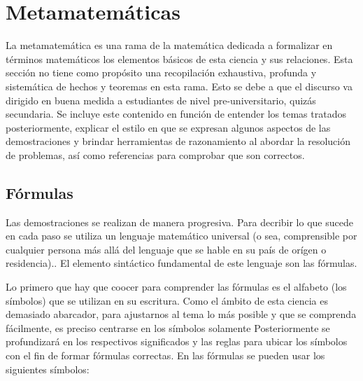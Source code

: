 



\section{Metamatemáticas}

La metamatemática es una rama de la matemática dedicada a formalizar en términos matemáticos los elementos básicos de esta ciencia y sus relaciones. Esta sección no tiene como propósito una recopilación exhaustiva, profunda y sistemática  de hechos y teoremas en esta rama. Esto se debe a que el discurso va dirigido en buena medida a estudiantes de nivel pre-universitario, quizás secundaria. Se incluye este contenido en función de entender los temas tratados posteriormente, explicar el estilo en que se expresan algunos aspectos de las demostraciones y brindar herramientas de razonamiento al abordar la resolución de problemas, así como referencias para comprobar que son correctos.

\subsection{Fórmulas} \label{chp_formulae}

Las demostraciones se realizan de manera progresiva. Para decribir lo que sucede en cada paso se utiliza un lenguaje matemático universal (o sea, comprensible por cualquier persona más allá del lenguaje que se hable en su país de orígen o residencia).. El elemento sintáctico fundamental de este lenguaje son las fórmulas.

Lo primero que hay que coocer para comprender las fórmulas es el alfabeto (los símbolos) que se utilizan en su escritura. Como el ámbito de esta ciencia es demasiado abarcador, para ajustarnos al tema lo más posible y que se comprenda fácilmente, es preciso centrarse en los símbolos solamente  Posteriormente se profundizará en los respectivos significados y las reglas para ubicar los símbolos con el fin de formar fórmulas correctas. En las fórmulas se pueden usar los siguientes símbolos:

